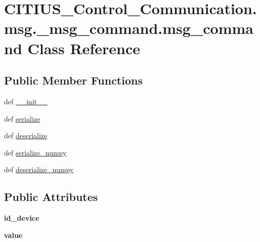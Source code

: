 \hypertarget{class_c_i_t_i_u_s___control___communication_1_1msg_1_1__msg__command_1_1msg__command}{\section{\-C\-I\-T\-I\-U\-S\-\_\-\-Control\-\_\-\-Communication.\-msg.\-\_\-msg\-\_\-command.\-msg\-\_\-command \-Class \-Reference}
\label{class_c_i_t_i_u_s___control___communication_1_1msg_1_1__msg__command_1_1msg__command}
}
\subsection*{\-Public \-Member \-Functions}
\begin{DoxyCompactItemize}
\item 
def \hyperlink{class_c_i_t_i_u_s___control___communication_1_1msg_1_1__msg__command_1_1msg__command_a46cd3b37615a850629cf4087d2800430}{\-\_\-\-\_\-init\-\_\-\-\_\-}
\item 
def \hyperlink{class_c_i_t_i_u_s___control___communication_1_1msg_1_1__msg__command_1_1msg__command_a31e0f714bbdcce85454c06bd73c203a8}{serialize}
\item 
def \hyperlink{class_c_i_t_i_u_s___control___communication_1_1msg_1_1__msg__command_1_1msg__command_af19af421990b98fe806f7b4090469f47}{deserialize}
\item 
def \hyperlink{class_c_i_t_i_u_s___control___communication_1_1msg_1_1__msg__command_1_1msg__command_a5c4d22317d14fba0f4a536a09f9dc421}{serialize\-\_\-numpy}
\item 
def \hyperlink{class_c_i_t_i_u_s___control___communication_1_1msg_1_1__msg__command_1_1msg__command_acf3ad3eed7b0507293950f12272a0f4a}{deserialize\-\_\-numpy}
\end{DoxyCompactItemize}
\subsection*{\-Public \-Attributes}
\begin{DoxyCompactItemize}
\item 
\hypertarget{class_c_i_t_i_u_s___control___communication_1_1msg_1_1__msg__command_1_1msg__command_adbbec3a147e39ddacf9fb85ffeba5e0f}{{\bfseries id\-\_\-device}}\label{class_c_i_t_i_u_s___control___communication_1_1msg_1_1__msg__command_1_1msg__command_adbbec3a147e39ddacf9fb85ffeba5e0f}

\item 
\hypertarget{class_c_i_t_i_u_s___control___communication_1_1msg_1_1__msg__command_1_1msg__command_a6fb3e861474c7bef1c0e82d864742664}{{\bfseries value}}\label{class_c_i_t_i_u_s___control___communication_1_1msg_1_1__msg__command_1_1msg__command_a6fb3e861474c7bef1c0e82d864742664}

\end{DoxyCompactItemize}
